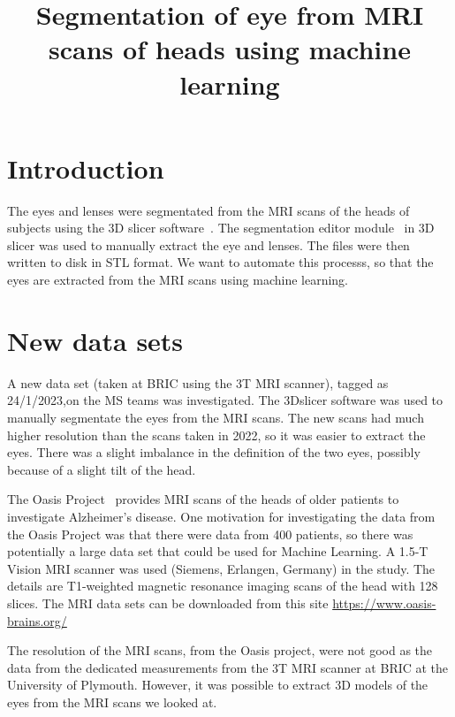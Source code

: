 \documentclass[12pt]{article}
\begin{document}
\title{Segmentation of eye from MRI scans of heads using machine learning}
\date{}

\maketitle


\section{Introduction}

The eyes and lenses were segmentated from the MRI scans of the heads
of subjects using the 3D slicer software~\cite{kikinis20133d}.  The
segmentation editor module~\cite{pinter2019polymorph} in 3D slicer was
used to manually extract the eye and lenses.  The files were then
written to disk in STL format.  We want to automate this processs, so
that the eyes are extracted from the MRI scans using machine learning.


\section{New data sets}

A new data set (taken at BRIC using the 3T MRI scanner), tagged as
24/1/2023,on the MS teams was investigated. The 3Dslicer software was
used to manually segmentate the eyes from the MRI scans. The new scans
had much higher resolution than the scans taken in 2022, so it was
easier to extract the eyes. There was a slight imbalance in the
definition of the two eyes, possibly because of a slight tilt of the
head.


The Oasis Project~\cite{van2021mri} provides MRI scans of the heads of
older patients to investigate Alzheimer's disease.  One motivation for
investigating the data from the Oasis Project was that there were data
from 400 patients, so there was potentially a large data set that
could be used for Machine Learning.  A 1.5-T Vision MRI scanner was
used (Siemens, Erlangen, Germany) in the study.  The details are
T1-weighted magnetic resonance imaging scans of the head with 128
slices.  The MRI data sets can be downloaded from this site
\url{https://www.oasis-brains.org/}


The resolution of the MRI scans, from the Oasis project, were not good
as the data from the dedicated measurements from the 3T MRI scanner at
BRIC at the University of Plymouth. However, it was possible to
extract 3D models of the eyes from the MRI scans we looked at.
\end{document}
